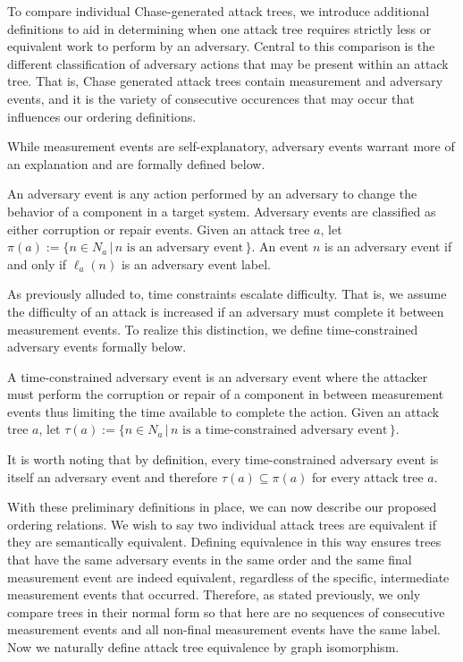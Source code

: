 \documentclass[runningheads]{llncs}
\theoremstyle{definition}
\begin{document}
To compare individual Chase-generated attack trees, we introduce additional definitions to aid in determining when one attack tree requires strictly less or equivalent work to perform by an adversary. Central to this comparison is the different classification of adversary actions that may be present within an attack tree. That is, Chase generated attack trees contain measurement and adversary events, and it is the variety of consecutive occurences that may occur that influences our ordering definitions. 

While measurement events are self-explanatory, adversary events warrant more of an explanation and are formally defined below.
 

\begin{definition}
    An adversary event is any action performed by an adversary to change the behavior of a component in a target system. Adversary events are classified as either corruption or repair events. Given an attack tree $a$, let $\pi(a) := \{n \in N_a \,|\, n \text{ is an adversary event}\,\}$. An event $n$ is an adversary event if and only if $\ell_a(n)$ is an adversary event label.
\end{definition}


As previously alluded to, time constraints escalate difficulty. That is, we assume the difficulty of an attack is increased if an adversary must complete it between measurement events. To realize this distinction, we define time-constrained adversary events formally below.  

\begin{definition}
    A time-constrained adversary event is an adversary event where the attacker must perform the corruption or repair of a component in between measurement events thus limiting the time available to complete the action. Given an attack tree $a$, let $\tau(a) := \{n \in N_a \,|\, n \text{ is a time-constrained adversary event}\,\}$.
\end{definition}

\noindent It is worth noting that by definition, every time-constrained adversary event is itself an adversary event and therefore $\tau(a) \subseteq \pi(a)$ for every attack tree $a$.


With these preliminary definitions in place, we can now describe our proposed ordering relations. We wish to say two individual attack trees are equivalent if they are semantically equivalent. Defining equivalence in this way ensures trees that have the same adversary events in the same order and the same final measurement event are indeed equivalent, regardless of the specific, intermediate measurement events that occurred. Therefore, as stated previously, we only compare trees in their normal form so that here are no sequences of consecutive measurement events and all non-final measurement events have the same label. Now we naturally define attack tree equivalence by graph isomorphism.
\end{document}

